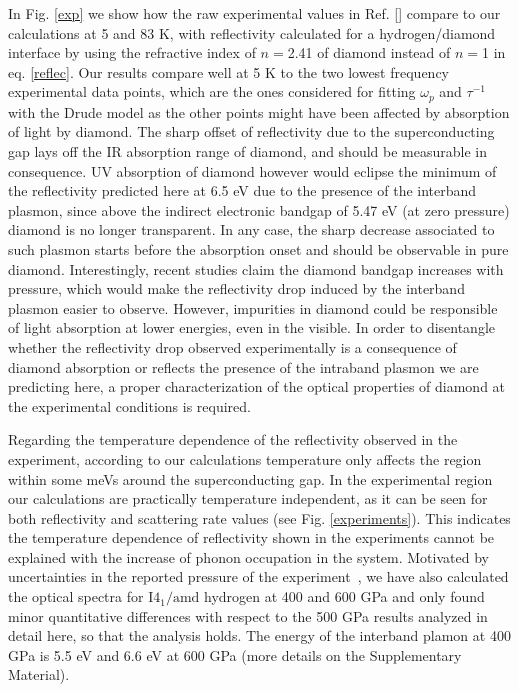 \documentclass[%
 reprint,
superscriptaddress,
 amsmath,amssymb,
 aps,
prb,
floatfix,
]{revtex4-1}
\begin{document}
In Fig. \ref{exp} we show how the raw experimental values in Ref. [] compare to our
calculations at 5 and 83 K, with reflectivity calculated for a hydrogen/diamond interface 
by using the refractive index of $n=$2.41 of diamond instead of $n=$1 in eq. \ref{reflec}. 
Our results compare well at 5 K to the two lowest frequency experimental data points, 
which are the ones considered for fitting $\omega_p$ and $\tau^{-1}$ with the 
Drude model as the other points might have been affected by absorption of 
light by diamond\cite{Diaseaal1579,Dias2017}.
The sharp offset of reflectivity due to the superconducting gap lays off the IR absorption range of diamond, 
and should be measurable in consequence.
UV absorption of diamond however would eclipse the minimum of the reflectivity
predicted here at 6.5 eV due to the presence of the 
interband plasmon, since above the indirect electronic bandgap of 5.47 eV (at zero pressure)
diamond is no longer transparent. 
In any case, the sharp decrease associated to such plasmon starts before the absorption onset
and should be observable in pure diamond. Interestingly, recent studies claim the diamond 
bandgap increases with pressure\cite{Gamboa2016}, which would make the 
reflectivity drop induced by the interband plasmon easier to observe. 
However, impurities in diamond could be responsible of light absorption at lower
energies, even in the visible\cite{Dias2017}.
In order to disentangle
whether the reflectivity drop observed experimentally is a consequence
of diamond absorption or reflects the presence of the intraband
plasmon we are predicting here, a
proper characterization of the optical properties of diamond
at the experimental conditions is required.
 
Regarding the temperature dependence of the reflectivity observed in the experiment, 
according to our calculations temperature only affects the region within some meVs 
around the superconducting gap. 
In the experimental region our calculations are practically temperature independent, 
as it can be seen for both reflectivity and scattering rate values (see Fig. \ref{experiments}).
This indicates the temperature dependence of reflectivity shown in 
the experiments cannot be explained with the increase of phonon occupation in the system.  
Motivated by uncertainties in the reported pressure of the 
experiment~\cite{Eremets2017,Loubeyre2017,Liu2017,Goncharov2017}, 
we have also calculated the optical spectra for $\mathrm{I4_1/amd}$ hydrogen 
at 400 and 600 GPa and only found minor quantitative differences with 
respect to the 500 GPa results analyzed in detail here, so that the analysis holds. 
The energy of the interband plamon at 400 GPa is 5.5 eV and
6.6 eV at 600 GPa (more details on the Supplementary Material).    
\end{document}
